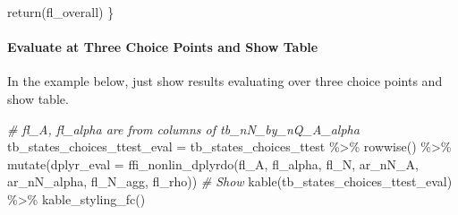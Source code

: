 \documentclass[
]{book}
\newenvironment{Shaded}{\begin{snugshade}}{\end{snugshade}}
\newcommand{\AttributeTok}[1]{\textcolor[rgb]{0.77,0.63,0.00}{#1}}
\newcommand{\CommentTok}[1]{\textcolor[rgb]{0.56,0.35,0.01}{\textit{#1}}}
\newcommand{\FunctionTok}[1]{\textcolor[rgb]{0.00,0.00,0.00}{#1}}
\newcommand{\NormalTok}[1]{#1}
\newcommand{\OtherTok}[1]{\textcolor[rgb]{0.56,0.35,0.01}{#1}}
\newcommand{\SpecialCharTok}[1]{\textcolor[rgb]{0.00,0.00,0.00}{#1}}
\begin{document}
\begin{Shaded}
\begin{Highlighting}[]
  \FunctionTok{return}\NormalTok{(fl\_overall)}
\NormalTok{\}}
\end{Highlighting}
\end{Shaded}

\hypertarget{evaluate-at-three-choice-points-and-show-table}{%
\paragraph{Evaluate at Three Choice Points and Show Table}\label{evaluate-at-three-choice-points-and-show-table}}

In the example below, just show results evaluating over three choice points and show table.

\begin{Shaded}
\begin{Highlighting}[]
\CommentTok{\# fl\_A, fl\_alpha are from columns of tb\_nN\_by\_nQ\_A\_alpha}
\NormalTok{tb\_states\_choices\_ttest\_eval }\OtherTok{=}\NormalTok{ tb\_states\_choices\_ttest }\SpecialCharTok{\%\textgreater{}\%} \FunctionTok{rowwise}\NormalTok{() }\SpecialCharTok{\%\textgreater{}\%}
                        \FunctionTok{mutate}\NormalTok{(}\AttributeTok{dplyr\_eval =} \FunctionTok{ffi\_nonlin\_dplyrdo}\NormalTok{(fl\_A, fl\_alpha, fl\_N,}
\NormalTok{                                                               ar\_nN\_A, ar\_nN\_alpha,}
\NormalTok{                                                               fl\_N\_agg, fl\_rho))}
\CommentTok{\# Show}
\FunctionTok{kable}\NormalTok{(tb\_states\_choices\_ttest\_eval) }\SpecialCharTok{\%\textgreater{}\%}
  \FunctionTok{kable\_styling\_fc}\NormalTok{()}
\end{Highlighting}
\end{Shaded}
\end{document}
